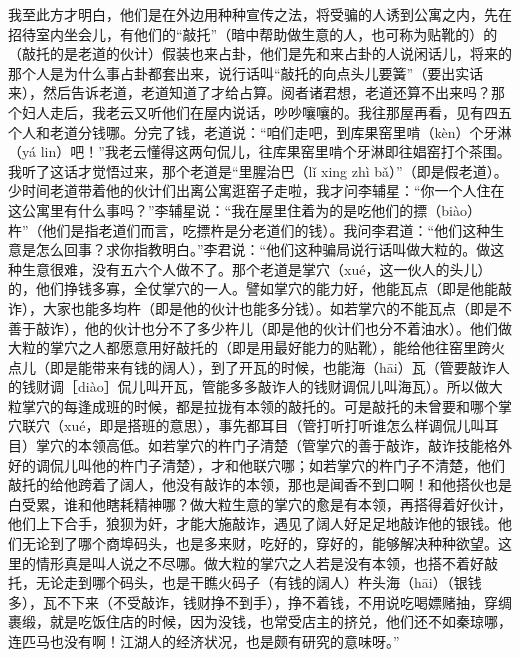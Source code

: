 \documentclass[12pt,UTF8]{ctexbook}
\begin{document}
我至此方才明白，他们是在外边用种种宣传之法，将受骗的人诱到公寓之内，先在招待室内坐会儿，有他们的“敲托”（暗中帮助做生意的人，也可称为贴靴的）的（敲托的是老道的伙计）假装也来占卦，他们是先和来占卦的人说闲话儿，将来的那个人是为什么事占卦都套出来，说行话叫“敲托的向点头儿要簧”（要出实话来），然后告诉老道，老道知道了才给占算。阅者诸君想，老道还算不出来吗？那个妇人走后，我老云又听他们在屋内说话，吵吵嚷嚷的。我往那屋再看，见有四五个人和老道分钱哪。分完了钱，老道说：“咱们走吧，到库果窑里啃（kèn）个牙淋（yá lin）吧！”我老云懂得这两句侃儿，往库果窑里啃个牙淋即往娼窑打个茶围。我听了这话才觉悟过来，那个老道是“里腥治巴（lǐ xing zhì bǎ）”（即是假老道）。少时间老道带着他的伙计们出离公寓逛窑子走啦，我才问李辅星：“你一个人住在这公寓里有什么事吗？”李辅星说：“我在屋里住着为的是吃他们的摽（biào）杵”（他们是指老道们而言，吃摽杵是分老道们的钱）。我问李君道：“他们这种生意是怎么回事？求你指教明白。”李君说：“他们这种骗局说行话叫做大粒的。做这种生意很难，没有五六个人做不了。那个老道是掌穴（xué，这一伙人的头儿）的，他们挣钱多寡，全仗掌穴的一人。譬如掌穴的能力好，他能瓦点（即是他能敲诈），大家也能多均杵（即是他的伙计也能多分钱）。如若掌穴的不能瓦点（即是不善于敲诈），他的伙计也分不了多少杵儿（即是他的伙计们也分不着油水）。他们做大粒的掌穴之人都愿意用好敲托的（即是用最好能力的贴靴），能给他往窑里跨火点儿（即是能带来有钱的阔人），到了开瓦的时候，也能海（hāi）瓦（管要敲诈人的钱财调［diào］侃儿叫开瓦，管能多多敲诈人的钱财调侃儿叫海瓦）。所以做大粒掌穴的每逢成班的时候，都是拉拢有本领的敲托的。可是敲托的未曾要和哪个掌穴联穴（xué，即是搭班的意思），事先都耳目（管打听打听谁怎么样调侃儿叫耳目）掌穴的本领高低。如若掌穴的杵门子清楚（管掌穴的善于敲诈，敲诈技能格外好的调侃儿叫他的杵门子清楚），才和他联穴哪；如若掌穴的杵门子不清楚，他们敲托的给他跨着了阔人，他没有敲诈的本领，那也是闻香不到口啊！和他搭伙也是白受累，谁和他瞎耗精神哪？做大粒生意的掌穴的愈是有本领，再搭得着好伙计，他们上下合手，狼狈为奸，才能大施敲诈，遇见了阔人好足足地敲诈他的银钱。他们无论到了哪个商埠码头，也是多来财，吃好的，穿好的，能够解决种种欲望。这里的情形真是叫人说之不尽哪。做大粒的掌穴之人若是没有本领，也搭不着好敲托，无论走到哪个码头，也是干瞧火码子（有钱的阔人）杵头海（hāi）（银钱多），瓦不下来（不受敲诈，钱财挣不到手），挣不着钱，不用说吃喝嫖赌抽，穿绸裹缎，就是吃饭住店的时候，因为没钱，也常受店主的挤兑，他们还不如秦琼哪，连匹马也没有啊！江湖人的经济状况，也是颇有研究的意味呀。”
\end{document}
